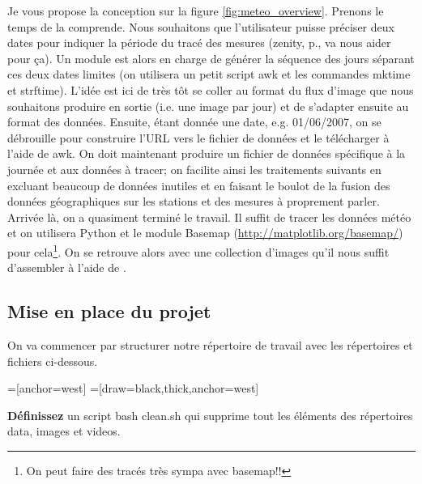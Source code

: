 Je vous propose la conception sur la figure \ref{fig:meteo_overview}. Prenons le temps de la comprende. Nous souhaitons que l'utilisateur puisse préciser deux dates pour indiquer la période du tracé des mesures (zenity, p.\pageref{sec:zenity}, va nous aider pour ça). Un module est alors en charge de générer la séquence des jours séparant ces deux dates limites (on utilisera un petit script awk et les commandes mktime et strftime). L'idée est ici de très tôt se coller au format du flux d'image que nous souhaitons produire en sortie (i.e. une image par jour) et de s'adapter ensuite au format des données. Ensuite, étant donnée une date, e.g. 01/06/2007, on se débrouille pour construire l'URL vers le fichier de données et le télécharger à l'aide de awk. On doit maintenant produire un fichier de données spécifique à la journée et aux données à tracer; on facilite ainsi les traitements suivants en excluant beaucoup de données inutiles et en faisant le boulot de la fusion des données géographiques sur les stations et des mesures à proprement parler. Arrivée là, on a quasiment terminé le travail. Il suffit de tracer les données météo et on utilisera Python et le module Basemap (\url{http://matplotlib.org/basemap/}) pour cela\footnote{On peut faire des tracés très sympa avec basemap!!}. On se retrouve alors avec une collection d'images qu'il nous suffit d'assembler à l'aide de \ffmpeg. 

\subsection{Mise en place du projet}

On va commencer par structurer notre répertoire de travail avec les
répertoires et fichiers ci-dessous.

\begin{center}
=[anchor=west]
=[draw=black,thick,anchor=west]
\end{center}

\textbf{Définissez} un script bash clean.sh qui supprime tout les éléments des répertoires data, images et videos.

